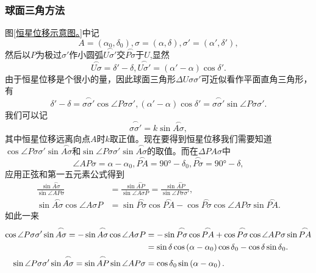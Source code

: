 \documentclass[11pt, a4paper, oneside]{ctexart}
\numberwithin{equation}{subsection}
\begin{document}
\subsubsection{球面三角方法}
图\ref{恒星位移示意图。}中记
\begin{equation}
A=\left(\alpha_0,\delta_0\right),\sigma=\left(\alpha,\delta\right),\sigma'=\left(\alpha',\delta'\right),
\end{equation}
然后以$P$为极过$\sigma'$作小圆弧$\overset{\frown}{U\sigma'}$交$\overset{\frown}{P\sigma}$于$U$,显然
\begin{equation}
\overset{\frown}{U\sigma}=\delta{}'-\delta{},\overset{\frown}{U\sigma'}=\left(\alpha'-\alpha\right)\cos\delta{}'.
\end{equation}
由于恒星位移是个很小的量，因此球面三角形$\Delta{}U\sigma\sigma'$可近似看作平面直角三角形，有
\begin{equation}
\delta'-\delta=\overset{\frown}{\sigma\sigma'}\cos\angle{P\sigma\sigma'},\left(\alpha'-\alpha\right)\cos\delta'=\overset{\frown}{\sigma\sigma'}\sin\angle{P\sigma\sigma'}.
\end{equation}
我们可以记
\begin{equation}
\overset{\frown}{\sigma\sigma'}=k\sin\overset{\frown}{A\sigma},
\end{equation}
其中恒星位移远离向点$A$时$k$取正值。现在要得到恒星位移我们需要知道$\cos\angle{P\sigma\sigma'}\sin\overset{\frown}{A\sigma}$和$\sin\angle{P\sigma\sigma'}\sin\overset{\frown}{A\sigma}$的取值。而在$\Delta{}PA\sigma$中
\begin{equation}
\angle{AP\sigma}=\alpha-\alpha_{0},\overset{\frown}{PA}=\ang{90;;}-\delta{}_{0},\overset{\frown}{P\sigma}=\ang{90;;}-\delta{},
\end{equation}
应用正弦和第一五元素公式得到
\begin{align}
\frac{\sin\overset{\frown}{A\sigma}}{\sin\angle{AP\sigma}}&=\frac{\sin\overset{\frown}{AP}}{\sin\angle{A\sigma P}}=\frac{\sin\overset{\frown}{AP}}{\sin\angle{P\sigma\sigma'}},\\
\sin\overset{\frown}{A\sigma}\cos\angle{A\sigma P}&=\sin\overset{\frown}{P\sigma}\cos\overset{\frown}{PA}-\cos\overset{\frown}{P\sigma}\cos\angle{AP\sigma}\sin\overset{\frown}{PA}.
\end{align}
如此一来
\begin{align}
\cos\angle{P\sigma\sigma'}\sin\overset{\frown}{A\sigma}=-\sin\overset{\frown}{A\sigma}\cos\angle{A\sigma P}&=-\sin\overset{\frown}{P\sigma}\cos\overset{\frown}{PA}+\cos\overset{\frown}{P\sigma}\cos\angle{AP\sigma}\sin\overset{\frown}{PA}\notag\\
&=\sin\delta{}\cos\left(\alpha-\alpha_{0}\right)\cos\delta{}_{0}-\cos\delta{}\sin\delta{}_{0}.\\
\sin\angle{P\sigma\sigma'}\sin\overset{\frown}{A\sigma}=\sin\overset{\frown}{AP}\sin\angle{AP\sigma}&=\cos\delta{}_{0}\sin\left(\alpha-\alpha_{0}\right).
\end{align}
\end{document}
